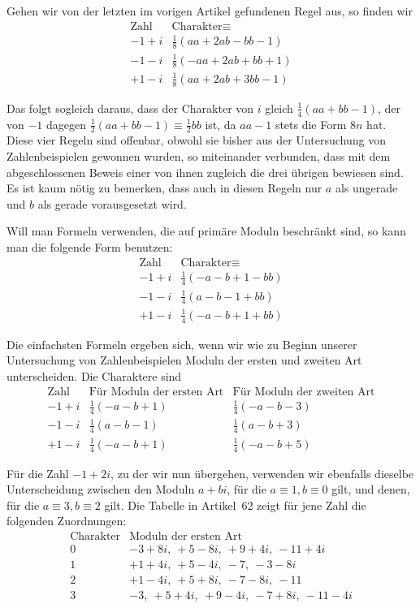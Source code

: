 %
Gehen wir von der letzten im vorigen Artikel gefundenen Regel aus, so finden wir
\[
\begin{array}{c|l}
\text{Zahl}&\text{Charakter}\equiv\\\hline
-1+i&\frac18(aa+2ab-bb-1)\\
-1-i&\frac18(-aa+2ab+bb+1)\\
+1-i&\frac18(aa+2ab+3bb-1)
\end{array}
\]

Das folgt sogleich daraus, dass der Charakter von $i$ gleich $\frac14(aa+bb-1)$, der von $-1$ dagegen $\frac12(aa+bb-1)\equiv\frac12bb$ ist, da $aa-1$ stets die Form $8n$ hat. Diese vier Regeln sind offenbar, obwohl sie bisher aus der Untersuchung von Zahlenbeispielen gewonnen wurden, so miteinander verbunden, dass mit dem abgeschlossenen Beweis einer von ihnen zugleich die drei übrigen bewiesen sind. Es ist kaum nötig zu bemerken, dass auch in diesen Regeln nur $a$ als ungerade und $b$ als gerade vorausgesetzt wird.

Will man Formeln verwenden, die auf primäre Moduln beschränkt sind, so kann man die folgende Form benutzen:
\[
\begin{array}{c|l}
\text{Zahl}&\text{Charakter}\equiv\\\hline
-1+i&\frac14(-a-b+1-bb)\\
-1-i&\frac14(a-b-1+bb)\\
+1-i&\frac14(-a-b+1+bb)
\end{array}
\]

Die einfachsten Formeln ergeben sich, wenn wir wie zu Beginn unserer Untersuchung von Zahlenbeispielen Moduln der ersten und zweiten Art unterscheiden. Die Charaktere sind
\[
\begin{array}{c|c|c}
\text{Zahl}&\text{Für Moduln der ersten Art}&\text{Für Moduln der zweiten Art}\\\hline
-1+i&\frac14(-a-b+1)&\frac14(-a-b-3)\\
-1-i&\frac14(a-b-1)&\frac14(a-b+3)\\
+1-i&\frac14(-a-b+1)&\frac14(-a-b+5)
\end{array}
\]

Für die Zahl $-1+2i$, zu der wir nun übergehen, verwenden wir ebenfalls dieselbe Unterscheidung zwischen den Moduln $a+bi$, für die $a\equiv1,b\equiv0$ gilt, und denen, für die $a\equiv3,b\equiv2$ gilt. Die Tabelle in Artikel~62 zeigt für jene Zahl die folgenden Zuordnungen:
%
\[
\begin{array}{c|l}
\text{Charakter}&\text{Moduln der ersten Art}\\\hline
0&-3+8i,\ +5-8i,\ +9+4i,\ -11+4i\\
1&+1+4i,\ +5-4i,\ -7,\ -3-8i\\
2&+1-4i,\ +5+8i,\ -7-8i,\ -11\\
3&-3,\ +5+4i,\ +9-4i,\ -7+8i,\ -11-4i
\end{array}
\]

